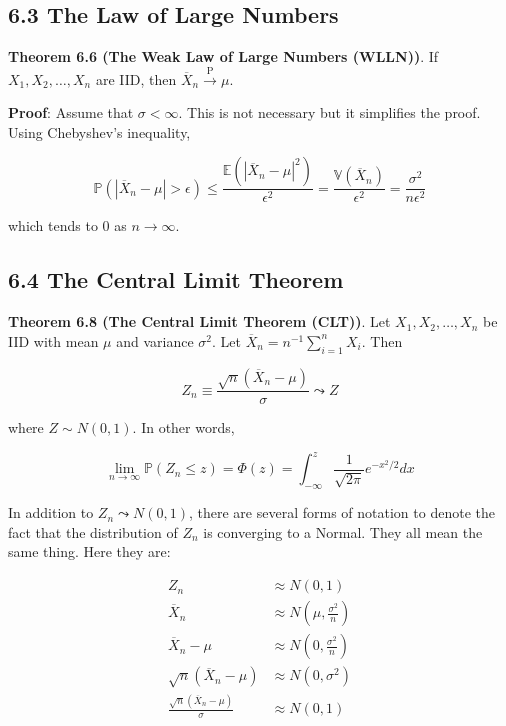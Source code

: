 \subsection*{6.3 The Law of Large
Numbers}\label{the-law-of-large-numbers}

\textbf{Theorem 6.6 (The Weak Law of Large Numbers (WLLN))}. If
\(X_{1}, X_{2}, \dots, X_{n}\) are IID, then
\(\overline{X}_{n} \xrightarrow{\text{P}} \mu\).

\textbf{Proof}: Assume that \(\sigma < \infty\). This is not necessary
but it simplifies the proof. Using Chebyshev's inequality,

\[ \mathbb{P}(|\overline{X}_{n} - \mu| > \epsilon) \leq \frac{\mathbb{E}(|\overline{X}_{n} - \mu|^{2})}{\epsilon^{2}} = \frac{\mathbb{V}(\overline{X}_{n})}{\epsilon^{2}} = \frac{\sigma^{2}}{n \epsilon^{2}} \]

which tends to 0 as \(n \rightarrow \infty\).

\subsection*{6.4 The Central Limit
Theorem}\label{the-central-limit-theorem}

\textbf{Theorem 6.8 (The Central Limit Theorem (CLT))}. Let
\(X_{1}, X_{2}, \dots, X_{n}\) be IID with mean \(\mu\) and variance
\(\sigma^{2}\). Let \(\overline{X}_{n} = n^{-1}\sum_{i=1}^{n} X_{i}\). Then

\[ Z_{n} \equiv \frac{\sqrt{n} \left( \overline{X}_{n} - \mu \right)}{\sigma} \leadsto Z \]

where \(Z \sim N(0, 1)\). In other words,

\[ \lim _{n \rightarrow \infty} \mathbb{P}(Z_{n} \leq z) = \Phi(z) = \int _{-\infty} ^z \frac{1}{\sqrt{2 \pi}} e^{-x^{2}/2}dx\]

In addition to \(Z_{n} \leadsto N(0, 1)\), there are several forms of
notation to denote the fact that the distribution of \(Z_{n}\) is
converging to a Normal. They all mean the same thing. Here they are:

\begin{align*}
Z_{n}                                           & \approx N(0, 1) \\
\overline{X}_{n}                                & \approx N\left( \mu, \frac{\sigma^{2}}{n} \right)  \\
\overline{X}_{n} - \mu                          & \approx N\left( 0,   \frac{\sigma^{2}}{n} \right)  \\
\sqrt{n}(\overline{X}_{n} - \mu)                & \approx N\left( 0, \sigma^{2} \right)              \\
\frac{\sqrt{n}(\overline{X}_{n} - \mu)}{\sigma} & \approx N(0, 1)
\end{align*}

